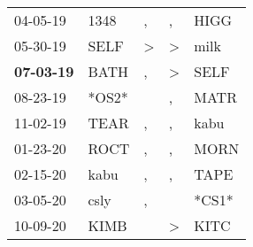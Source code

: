 \begin{supertabular}{p{0.07\textwidth}p{0.06\textwidth}p{0.02\textwidth}p{0.02\textwidth}p{0.06\textwidth}}
          04-05-19\textsuperscript{} &           1348\textsuperscript{} &                , &             , &  HIGG\textsuperscript{} \\
          05-30-19\textsuperscript{} &           SELF\textsuperscript{} &     \textgreater &  \textgreater &  milk\textsuperscript{} \\
 \textbf{07-03-19\textsuperscript{}} &           BATH\textsuperscript{} &                , &  \textgreater &  SELF\textsuperscript{} \\
          08-23-19\textsuperscript{} &                            *OS2* &                  &             , &  MATR\textsuperscript{} \\
          11-02-19\textsuperscript{} &           TEAR\textsuperscript{} &                , &             , &  kabu\textsuperscript{} \\
          01-23-20\textsuperscript{} &           ROCT\textsuperscript{} &                , &             , &  MORN\textsuperscript{} \\
          02-15-20\textsuperscript{} &           kabu\textsuperscript{} &                , &             , &  TAPE\textsuperscript{} \\
          03-05-20\textsuperscript{} &           csly\textsuperscript{} &                , &               &                   *CS1* \\
          10-09-20\textsuperscript{} &           KIMB\textsuperscript{} &                  &  \textgreater &  KITC\textsuperscript{} \\
\end{supertabular}
